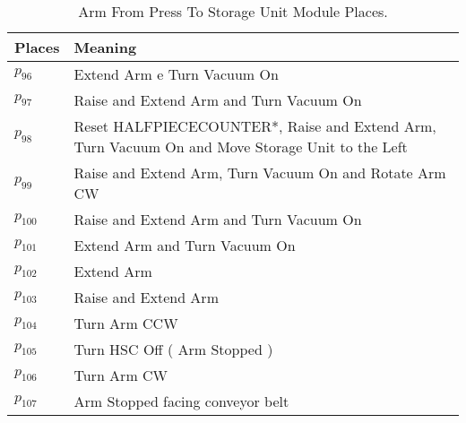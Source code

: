 \begin{table}[H]
\caption{Arm From Press To Storage Unit Module Places.}
\centering
\begin{tabular}{M{5cm}M{10cm}}
Places & Meaning\\
\hline
\hyperlink{partialNet:p961}{\hypertarget{partialTable:p96}{$p_{96}$}} & Extend Arm e Turn Vacuum On\\
\hyperlink{partialNet:p971}{\hypertarget{partialTable:p97}{$p_{97}$}} & Raise and Extend Arm and Turn Vacuum On\\
\hyperlink{partialNet:p981}{\hypertarget{partialTable:p98}{$p_{98}$}} & Reset HALFPIECECOUNTER*, Raise and Extend Arm, Turn Vacuum On and Move Storage Unit to the Left\\
\hyperlink{partialNet:p991}{\hypertarget{partialTable:p99}{$p_{99}$}} & Raise and Extend Arm, Turn Vacuum On and Rotate Arm CW\\
\hyperlink{partialNet:p1001}{\hypertarget{partialTable:p100}{$p_{100}$}} & Raise and Extend Arm and Turn Vacuum On\\
\hyperlink{partialNet:p1011}{\hypertarget{partialTable:p101}{$p_{101}$}} & Extend Arm and Turn Vacuum On\\
\hyperlink{partialNet:p1021}{\hypertarget{partialTable:p102}{$p_{102}$}} & Extend Arm\\
\hyperlink{partialNet:p1031}{\hypertarget{partialTable:p103}{$p_{103}$}} & Raise and Extend Arm\\
\hyperlink{partialNet:p1041}{\hypertarget{partialTable:p104}{$p_{104}$}} & Turn Arm CCW\\
\hyperlink{partialNet:p1051}{\hypertarget{partialTable:p105}{$p_{105}$}} & Turn HSC Off ( Arm Stopped )\\
\hyperlink{partialNet:p1061}{\hypertarget{partialTable:p106}{$p_{106}$}} & Turn Arm CW\\
\hyperlink{partialNet:p1071}{\hypertarget{partialTable:p107}{$p_{107}$}} & Arm Stopped facing conveyor belt\\
\end{tabular}
\end{table}
